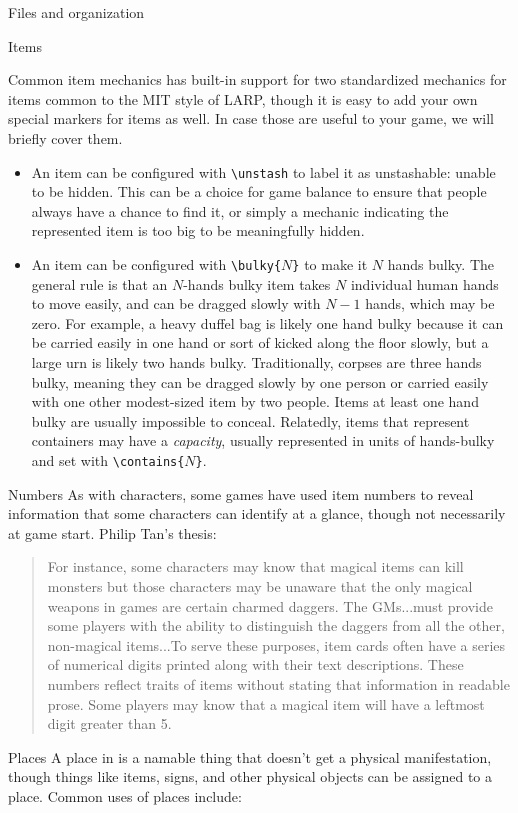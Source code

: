 \documentclass[sheet]{GameTexBase}
\begin{document}
\begin{section}{Files and organization}
\begin{subsection}{Items}
\begin{subsubsection}{Common item mechanics}
\gametex{} has built-in support for two standardized mechanics for items common to the MIT style of LARP, though it is easy to add your own special markers for items as well.  In case those are useful to your game, we will briefly cover them.
\begin{itemize}
\item An item can be configured with \lstinline|\unstash| to label it as unstashable: unable to be hidden.  This can be a choice for game balance to ensure that people always have a chance to find it, or simply a mechanic indicating the represented item is too big to be meaningfully hidden.
\item An item can be configured with \texttt{\textbackslash{}bulky\{$N$\}} to make it $N$ hands bulky.  The general rule is that an $N$-hands bulky item takes $N$ individual human hands to move easily, and can be dragged slowly with $N-1$ hands, which may be zero.  For example, a heavy duffel bag is likely one hand bulky because it can be carried easily in one hand or sort of kicked along the floor slowly, but a large urn is likely two hands bulky.  Traditionally, corpses are three hands bulky, meaning they can be dragged slowly by one person or carried easily with one other modest-sized item by two people.  Items at least one hand bulky are usually impossible to conceal.  Relatedly, items that represent containers may have a \emph{capacity}, usually represented in units of hands-bulky and set with \texttt{\textbackslash{}contains\{$N$\}}.
\end{itemize}
\end{subsubsection}
\begin{subsubsection}{Numbers}
As with characters, some games have used item numbers to reveal information that some characters can identify at a glance, though not necessarily at game start.  Philip Tan's thesis:
\begin{quote}
For instance, some characters may know that magical items can kill monsters but those
characters may be unaware that the only magical weapons in games are certain charmed
daggers. The GMs...must provide some players with the
ability to distinguish the daggers from all the other, non-magical items...To serve these purposes, item cards often have a series of numerical digits printed along
with their text descriptions. These numbers reflect traits of items without stating that
information in readable prose. Some players may know that a magical item will have a
leftmost digit greater than 5.
\end{quote}
\end{subsubsection}
\end{subsection}
\begin{subsection}{Places}
A place in \gametex{} is a namable thing that doesn't get a physical manifestation, though things like
items, signs, and other physical objects can be assigned to a place.  Common uses of places include:


\end{subsection}
\end{section}
\end{document}
